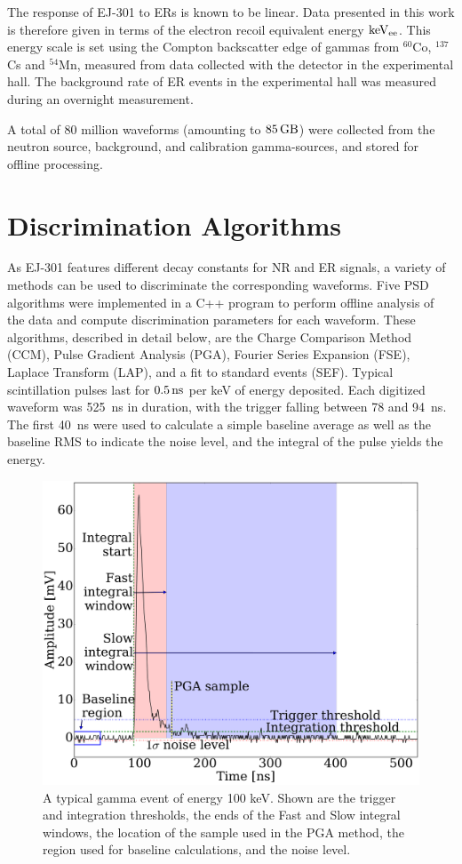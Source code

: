 The response of EJ-301 to ERs is known to be linear. Data presented in this work is therefore given in terms of the electron recoil equivalent energy $\mathrm{keV_{ee}}$. This energy scale is set using the Compton backscatter edge of gammas from $^{60}$Co, $^{137}$Cs and $^{54}$Mn, measured from data collected with the detector in the experimental hall. The background rate of ER events in the experimental hall was measured during an overnight measurement.

A total of 80 million waveforms (amounting to $85\,\mathrm{GB}$) were collected from the neutron source, background, and calibration gamma-sources, and stored for offline processing.

\section{Discrimination Algorithms}\label{sec:algorithms}

As EJ-301 features different decay constants for NR and ER signals, a variety of methods can be used to discriminate the corresponding waveforms. Five PSD algorithms were implemented in a C++ program to perform offline analysis of the data and compute discrimination parameters for each waveform. These algorithms, described in detail below, are the Charge Comparison Method (CCM), Pulse Gradient Analysis (PGA), Fourier Series Expansion (FSE), Laplace Transform (LAP), and a fit to standard events (SEF). Typical scintillation pulses last for $0.5\,\mathrm{ns}$ per keV of energy deposited. Each digitized waveform was 525~ns in duration, with the trigger falling between 78 and 94~ns. The first 40~ns were used to calculate a simple baseline average as well as the baseline RMS to indicate the noise level, and the integral of the pulse yields the energy.

\begin{figure}[htbp]
\centering
    \includegraphics[width=\columnwidth]{figures/psd/fig_annotated_event}
    \caption{A typical gamma event of energy 100 keV. Shown are the trigger and integration thresholds, the ends of the Fast and Slow integral windows, the location of the sample used in the PGA method, the region used for baseline calculations, and the noise level.}\label{fig:psd_waveform}
\end{figure}

